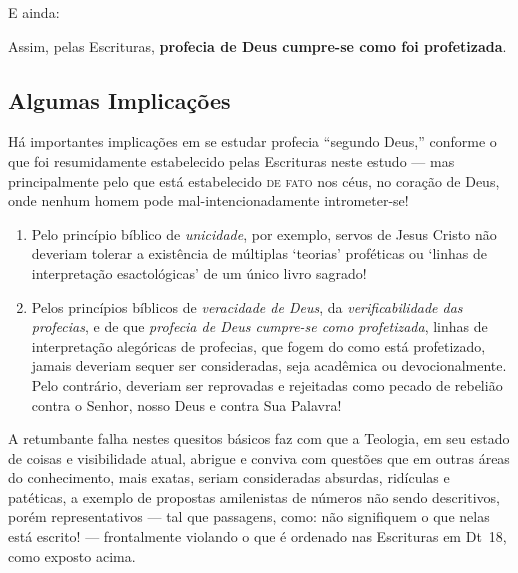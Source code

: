     E ainda:


    Assim, pelas Escrituras, \textbf{profecia de Deus cumpre-se como foi profetizada}.

    \subsection{Algumas Implicações}

    Há importantes implicações em se estudar profecia ``segundo Deus,'' conforme o  que  foi  resumidamente  estabelecido  pelas
    Escrituras neste estudo --- mas principalmente pelo que está estabelecido \textsc{de fato} nos céus,  no  coração  de  Deus,
    onde nenhum homem pode mal-intencionadamente intrometer-se!

    \begin{enumerate}

        \item Pelo princípio bíblico de \emph{unicidade}, por exemplo, servos de Jesus Cristo não deveriam tolerar a existência
            de múltiplas `teorias' proféticas ou `linhas de interpretação esactológicas' de um único livro sagrado!

        \item Pelos princípios bíblicos de \emph{veracidade de Deus}, da \emph{verificabilidade das profecias}, e de que
            \emph{profecia de Deus cumpre-se como profetizada}, linhas de interpretação alegóricas de profecias, que fogem do
            como está profetizado, jamais deveriam sequer ser consideradas, seja acadêmica ou devocionalmente. Pelo contrário,
            deveriam ser reprovadas e rejeitadas como pecado de rebelião contra o Senhor, nosso Deus e contra Sua Palavra!

    \end{enumerate}

    A retumbante falha nestes quesitos básicos faz com que a Teologia, em seu estado de coisas e visibilidade atual,  abrigue  e
    conviva com questões que em outras áreas do conhecimento, mais exatas, seriam consideradas absurdas, ridículas e  patéticas,
    a exemplo de propostas amilenistas de números não sendo descritivos, porém representativos  ---  tal  que  passagens,  como:
     não signifiquem o que nelas  está  escrito!  ---
    frontalmente violando o que é ordenado nas Escrituras em Dt~18, como exposto acima.

